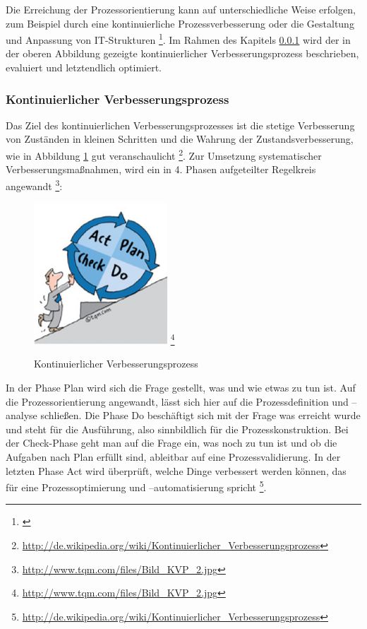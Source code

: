 Die Erreichung der Prozessorientierung kann auf unterschiedliche Weise erfolgen, zum Beispiel durch eine kontinuierliche Prozessverbesserung oder die Gestaltung und Anpassung von IT-Strukturen \footnote{\url{}}. Im Rahmen des Kapitels \ref{subsubsection_kontinuierlicher_verbesserungsprozess}  wird der in der oberen Abbildung gezeigte kontinuierlicher Verbesserungsprozess beschrieben, evaluiert und letztendlich optimiert.



\subsubsection{Kontinuierlicher Verbesserungsprozess}
\label{subsubsection_kontinuierlicher_verbesserungsprozess}
Das Ziel des kontinuierlichen Verbesserungsprozesses ist die stetige Verbesserung von Zuständen in kleinen Schritten und die Wahrung der  Zustandsverbesserung, wie in Abbildung \ref{fig_kontinuierliche_verbesserung} gut veranschaulicht \footnote{\url{http://de.wikipedia.org/wiki/Kontinuierlicher_Verbesserungsprozess}}. Zur Umsetzung systematischer Verbesserungsmaßnahmen, wird ein in 4. Phasen aufgeteilter Regelkreis angewandt \footnote{\url{http://www.tqm.com/files/Bild_KVP_2.jpg}}:
 
\begin{figure}[h!]
	\centering
	\includegraphics[width=5cm]{kapitel/gruppe1_2/bilder/kontinuierlicher_verbesserungsprozess} \footnote{\url{http://www.tqm.com/files/Bild_KVP_2.jpg}}
	\caption{Kontinuierlicher Verbesserungsprozess}
	\label{fig_kontinuierliche_verbesserung}
\end{figure}


In der Phase Plan wird sich die Frage gestellt, was und wie etwas zu tun ist. Auf die Prozessorientierung angewandt, lässt sich hier auf die Prozessdefinition und –analyse schließen. Die Phase Do beschäftigt sich mit der Frage was erreicht wurde und steht für die Ausführung, also sinnbildlich für die Prozesskonstruktion. Bei der Check-Phase geht man auf die Frage ein, was noch zu tun ist und ob die Aufgaben nach Plan erfüllt sind, ableitbar auf eine Prozessvalidierung. In der letzten Phase Act wird überprüft, welche Dinge verbessert werden können, das für eine Prozessoptimierung und –automatisierung spricht \footnote{\url{http://de.wikipedia.org/wiki/Kontinuierlicher_Verbesserungsprozess}}.



